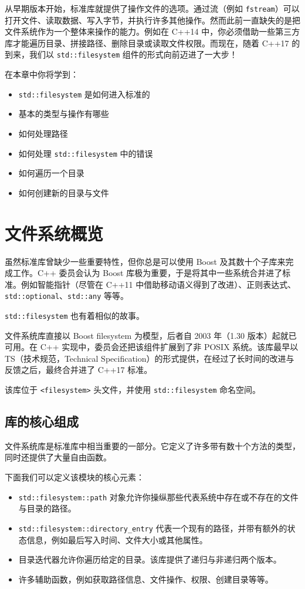 从早期版本开始，标准库就提供了操作文件的选项。通过流（例如 \texttt{fstream}）可以打开文件、读取数据、写入字节，并执行许多其他操作。然而此前一直缺失的是把文件系统作为一个整体来操作的能力。例如在 C++14 中，你必须借助一些第三方库才能遍历目录、拼接路径、删除目录或读取文件权限。而现在，随着 C++17 的到来，我们以 \texttt{std::filesystem} 组件的形式向前迈进了一大步！

在本章中你将学到：

\begin{itemize}
\item \texttt{std::filesystem} 是如何进入标准的
\item 基本的类型与操作有哪些
\item 如何处理路径
\item 如何处理 \texttt{std::filesystem} 中的错误
\item 如何遍历一个目录
\item 如何创建新的目录与文件
\end{itemize}

\section{文件系统概览}

虽然标准库曾缺少一些重要特性，但你总是可以使用 Boost 及其数十个子库来完成工作。C++ 委员会认为 Boost 库极为重要，于是将其中一些系统合并进了标准。例如智能指针（尽管在 C++11 中借助移动语义得到了改进）、正则表达式、\texttt{std::optional}、\texttt{std::any} 等等。

\texttt{std::filesystem} 也有着相似的故事。

文件系统库直接以 Boost filesystem 为模型，后者自 2003 年（1.30 版本）起就已可用。在 C++ 实现中，委员会还把该组件扩展到了非 POSIX 系统。该库最早以 TS（技术规范，Technical Specification）的形式提供，在经过了长时间的改进与反馈之后，最终合并进了 C++17 标准。

该库位于 \texttt{<filesystem>} 头文件，并使用 \texttt{std::filesystem} 命名空间。

\subsection{库的核心组成}

文件系统库是标准库中相当重要的一部分。它定义了许多带有数十个方法的类型，同时还提供了大量自由函数。

下面我们可以定义该模块的核心元素：

\begin{itemize}
\item \texttt{std::filesystem::path} 对象允许你操纵那些代表系统中存在或不存在的文件与目录的路径。
\item \texttt{std::filesystem::directory\_entry} 代表一个现有的路径，并带有额外的状态信息，例如最后写入时间、文件大小或其他属性。
\item 目录迭代器允许你遍历给定的目录。该库提供了递归与非递归两个版本。
\item 许多辅助函数，例如获取路径信息、文件操作、权限、创建目录等等。
\end{itemize}

